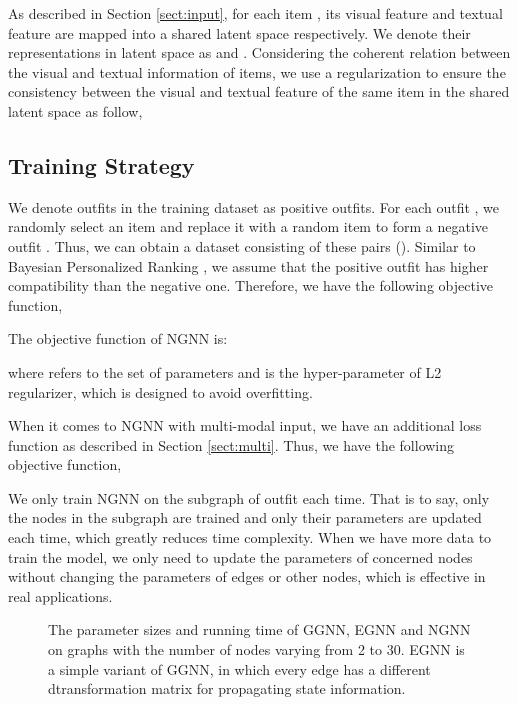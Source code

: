 \documentclass[sigconf]{acmart}
\begin{document}
As described in Section \ref{sect:input}, for each item , its visual feature  and textual feature  are mapped into a shared latent space respectively. We denote their representations in latent space as  and . Considering the coherent relation between the visual and textual information of items, we use a regularization to ensure the consistency between the visual and textual feature of the same item in the shared latent space as follow,


\subsection{Training Strategy}


We denote outfits in the training dataset as positive outfits.
For each outfit  , we randomly select an item  and replace it with a random item  to form a negative outfit . Thus, we can obtain a dataset  consisting of these pairs ().
Similar to Bayesian Personalized Ranking \cite{rendle2009bpr}, we assume that the positive outfit has higher compatibility than the negative one. Therefore, we have the following objective function,

The objective function of NGNN is:

where  refers to the set of parameters and
 is the hyper-parameter of L2 regularizer, which is designed to avoid overfitting.


When it comes to NGNN with multi-modal input, we have an additional loss function  as described in Section \ref{sect:multi}. Thus, we have the following objective function,



We only train NGNN on the subgraph of outfit each time. That is to say, only the nodes in the subgraph are trained and only their parameters are updated each time, which greatly reduces time complexity.
When we have more data to train the model, we only need to update the parameters of concerned nodes without changing the parameters of edges or other nodes, which is effective in real applications.


\begin{figure}[htbp]
\centering

\caption{The parameter sizes and running time of GGNN, EGNN and NGNN on graphs with the number of nodes varying from 2 to 30. EGNN is a simple variant of GGNN, in which every edge has a different dtransformation matrix for propagating state information. }
\label{fig:complexity}
\end{figure}
\end{document}
